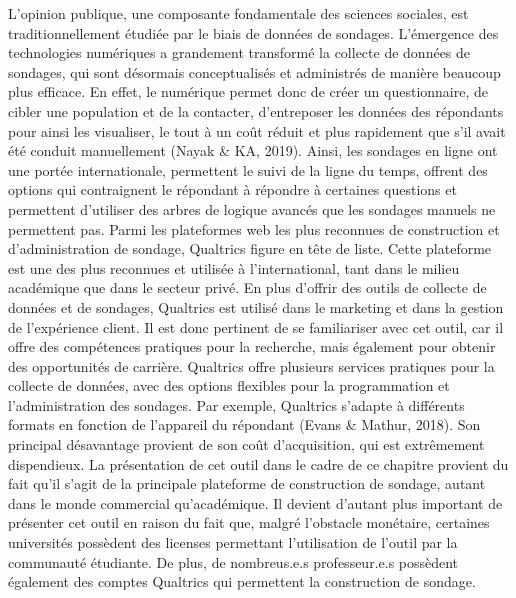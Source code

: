 \documentclass[
  letterpaper,
  DIV=11,
  numbers=noendperiod]{scrreprt}
\begin{document}
L'opinion publique, une composante fondamentale des sciences sociales,
est traditionnellement étudiée par le biais de données de sondages.
L'émergence des technologies numériques a grandement transformé la
collecte de données de sondages, qui sont désormais conceptualisés et
administrés de manière beaucoup plus efficace. En effet, le numérique
permet donc de créer un questionnaire, de cibler une population et de la
contacter, d'entreposer les données des répondants pour ainsi les
visualiser, le tout à un coût réduit et plus rapidement que s'il avait
été conduit manuellement (Nayak \& KA, 2019). Ainsi, les sondages en
ligne ont une portée internationale, permettent le suivi de la ligne du
temps, offrent des options qui contraignent le répondant à répondre à
certaines questions et permettent d'utiliser des arbres de logique
avancés que les sondages manuels ne permettent pas. Parmi les
plateformes web les plus reconnues de construction et d'administration
de sondage, Qualtrics figure en tête de liste. Cette plateforme est une
des plus reconnues et utilisée à l'international, tant dans le milieu
académique que dans le secteur privé. En plus d'offrir des outils de
collecte de données et de sondages, Qualtrics est utilisé dans le
marketing et dans la gestion de l'expérience client. Il est donc
pertinent de se familiariser avec cet outil, car il offre des
compétences pratiques pour la recherche, mais également pour obtenir des
opportunités de carrière. Qualtrics offre plusieurs services pratiques
pour la collecte de données, avec des options flexibles pour la
programmation et l'administration des sondages. Par exemple, Qualtrics
s'adapte à différents formats en fonction de l'appareil du répondant
(Evans \& Mathur, 2018). Son principal désavantage provient de son coût
d'acquisition, qui est extrêmement dispendieux. La présentation de cet
outil dans le cadre de ce chapitre provient du fait qu'il s'agit de la
principale plateforme de construction de sondage, autant dans le monde
commercial qu'académique. Il devient d'autant plus important de
présenter cet outil en raison du fait que, malgré l'obstacle monétaire,
certaines universités possèdent des licenses permettant l'utilisation de
l'outil par la communauté étudiante. De plus, de nombreus.e.s
professeur.e.s possèdent également des comptes Qualtrics qui permettent
la construction de sondage.
\end{document}
